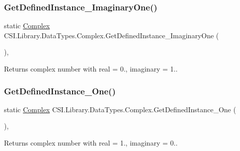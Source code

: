 \subsubsection{\texorpdfstring{GetDefinedInstance\_ImaginaryOne()}{GetDefinedInstance\_ImaginaryOne()}}
{\footnotesize\ttfamily static \mbox{\hyperlink{struct_c_s_i_1_1_library_1_1_data_types_1_1_complex}{Complex}} C\+S\+I.\+Library.\+Data\+Types.\+Complex.\+Get\+Defined\+Instance\+\_\+\+Imaginary\+One (\begin{DoxyParamCaption}{ }\end{DoxyParamCaption})\hspace{0.3cm}{\ttfamily [inline]}, {\ttfamily [static]}}



Returns complex number with real = 0., imaginary = 1.. 

\mbox{\label{struct_c_s_i_1_1_library_1_1_data_types_1_1_complex_adfc9b143806ae8ce3e2dacb1c62ab458}} 
\subsubsection{\texorpdfstring{GetDefinedInstance\_One()}{GetDefinedInstance\_One()}}
{\footnotesize\ttfamily static \mbox{\hyperlink{struct_c_s_i_1_1_library_1_1_data_types_1_1_complex}{Complex}} C\+S\+I.\+Library.\+Data\+Types.\+Complex.\+Get\+Defined\+Instance\+\_\+\+One (\begin{DoxyParamCaption}{ }\end{DoxyParamCaption})\hspace{0.3cm}{\ttfamily [inline]}, {\ttfamily [static]}}



Returns complex number with real = 1., imaginary = 0.. 

\mbox{\label{struct_c_s_i_1_1_library_1_1_data_types_1_1_complex_a16b834dafff811021ea734ebe877343b}} 

